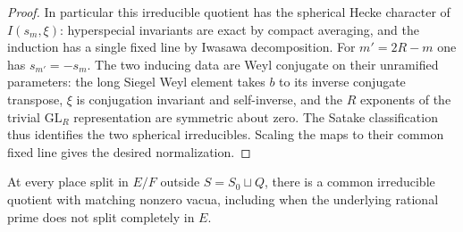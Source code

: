 \begin{proof}
In particular this irreducible quotient has the spherical Hecke
character of \(I(s_m,\xi)\): hyperspecial invariants are exact by
compact averaging, and the induction has a single fixed line by
Iwasawa decomposition. For \(m'=2R-m\) one has \(s_{m'}=-s_m\).
The two inducing data are Weyl conjugate on their unramified
parameters: the long Siegel Weyl element takes \(b\) to its
inverse conjugate transpose, \(\xi\) is conjugation invariant
and self-inverse, and the \(R\) exponents of the trivial
\(\mathrm{GL}_R\) representation are symmetric about zero.
The Satake classification thus identifies the two spherical
irreducibles. Scaling the maps to their common fixed line gives
the desired normalization.
\end{proof}

\begin{proposition}
\label{threal:ordinarysplit}
At every place split in \(E/F\) outside \(S=S_0\sqcup Q\), there
is a common irreducible quotient with matching nonzero vacua,
including when the underlying rational prime does not split
completely in \(E\).
\end{proposition}
